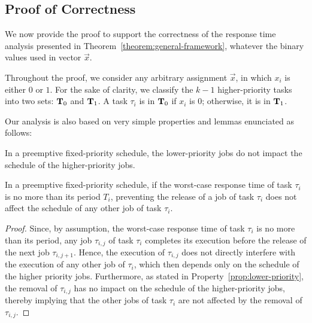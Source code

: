 \subsection{Proof of Correctness}  
\label{sec:proof-th1}

We now provide the proof to support the correctness of the response time analysis presented in
Theorem~\ref{theorem:general-framework}, whatever the binary values
used in vector $\vec{x}$.  %

Throughout the proof, we consider any arbitrary assignment
$\vec{x}$, in which $x_i$ is either $0$ or $1$. For the sake of clarity, we classify the $k-1$
higher-priority tasks into two sets: ${\bf T}_0$ and ${\bf T}_1$. A
task $\tau_i$ is in ${\bf T}_0$ if $x_i$ is $0$; otherwise, it is in
${\bf T}_1$.




Our analysis is also based on very simple properties and lemmas enunciated as follows:

\begin{Property}
\label{prop:lower-priority}
In a preemptive fixed-priority schedule, the lower-priority jobs do not impact the schedule of the higher-priority jobs.
\end{Property}


\begin{Lemma}
\label{lemma:remove-same-task}
In a preemptive fixed-priority schedule, if the worst-case response time of task $\tau_i$ is no more than its period $T_i$, preventing the release of a job of task $\tau_i$ does not affect the schedule of any other job of task $\tau_i$.
\end{Lemma}
\begin{proof}
Since, by assumption, the worst-case response time of task $\tau_i$ is no more than its period, any job $\tau_{i,j}$ of task $\tau_i$ completes its execution before the release of the next job $\tau_{i,j+1}$. Hence, the execution of $\tau_{i,j}$ does not directly interfere with the execution of any other job of $\tau_i$, which then depends only on the schedule of the higher priority jobs. Furthermore, as stated in Property~\ref{prop:lower-priority}, the removal of $\tau_{i,j}$ has no impact on the schedule of the higher-priority jobs, thereby implying that the other jobs of task $\tau_i$ are not affected by the removal of $\tau_{i,j}$.
\end{proof}


